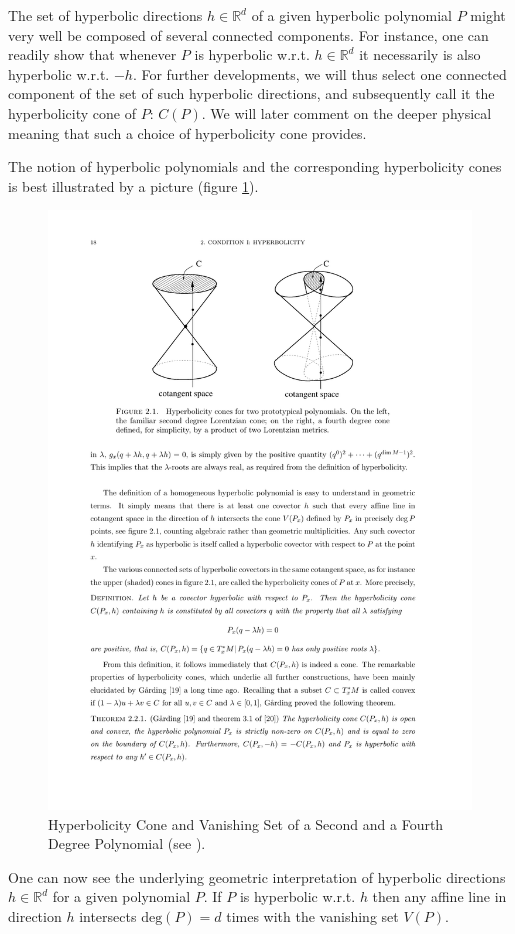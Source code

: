The set of hyperbolic directions $h\in \mathbb{R}^d$ of a given hyperbolic polynomial $P$ might very well be composed of several connected components. For instance, one can readily show that whenever $P$ is hyperbolic w.r.t. $h\in \mathbb{R}^d$ it necessarily is also hyperbolic w.r.t. $-h$. For further developments, we will thus select one connected component of the set of such hyperbolic directions, and subsequently call it the hyperbolicity cone of $P$: $C(P)$. We will later comment on the deeper physical meaning that such a choice of hyperbolicity cone provides.

The notion of hyperbolic polynomials and the corresponding hyperbolicity cones is best illustrated by a picture (figure \ref{hyperbol}). 
\begin{figure}[hbt!]
    \centering
    \includegraphics[width=\textwidth]{Poly.pdf}
    \caption{Hyperbolicity Cone and Vanishing Set of a Second and a Fourth Degree Polynomial (see \cite{Rivera}).}
    \label{hyperbol}
\end{figure}
One can now see the underlying geometric interpretation of  hyperbolic directions  $h\in \mathbb{R}^d$ for a given polynomial $P$. If $P$ is hyperbolic w.r.t. $h$ then any affine line in direction $h$ intersects $\mathrm{deg}(P) = d$ times with the vanishing set $V(P)$.

